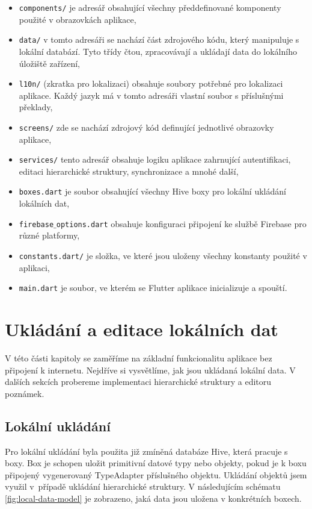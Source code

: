 \documentclass[czech, bc, kiv, he, iso690numb]{fasthesis}
\begin{document}
\begin{itemize}
    \item \texttt{components/} je adresář obsahující všechny předdefinované komponenty použité v obrazovkách aplikace,
    \item \texttt{data/} v tomto adresáři se nachází část zdrojového kódu, který manipuluje s lokální databází. Tyto třídy čtou, zpracovávají a ukládají data do lokálního úložiště zařízení,
    \item \texttt{l10n/} (zkratka pro lokalizaci) obsahuje soubory potřebné pro lokalizaci aplikace. Každý jazyk má v tomto adresáři vlastní soubor s příslušnými překlady,
    \item \texttt{screens/} zde se nachází zdrojový kód definující jednotlivé obrazovky aplikace,  
    \item \texttt{services/} tento adresář obsahuje logiku aplikace zahrnující autentifikaci, editaci hierarchické struktury, synchronizace a mnohé další,
    \item \texttt{boxes.dart} je soubor obsahující všechny Hive boxy pro lokální ukládání lokálních dat,
    \item \texttt{firebase$\_$options.dart} obsahuje konfiguraci připojení ke službě Firebase pro různé platformy,
    \item \texttt{constants.dart/} je složka, ve které jsou uloženy všechny konstanty použité v aplikaci, 
    \item \texttt{main.dart} je soubor, ve kterém se Flutter aplikace inicializuje a spouští.
\end{itemize}

\section{Ukládání a editace lokálních dat}

V této části kapitoly se zaměříme na základní funkcionalitu aplikace bez připojení k internetu. Nejdříve si vysvětlíme, jak jsou ukládaná lokální data. V dalších sekcích probereme implementaci hierarchické struktury a editoru poznámek.

\subsection{Lokální ukládání}

Pro lokální ukládání byla použita již zmíněná databáze Hive, která pracuje s boxy. Box je schopen uložit primitivní datové typy nebo objekty, pokud je k boxu připojený vygenerovaný TypeAdapter příslušného objektu. Ukládání objektů jsem využil v~případě ukládání hierarchické struktury. V následujícím schématu \ref{fig:local-data-model} je zobrazeno, jaká data jsou uložena v konkrétních boxech.
\end{document}
